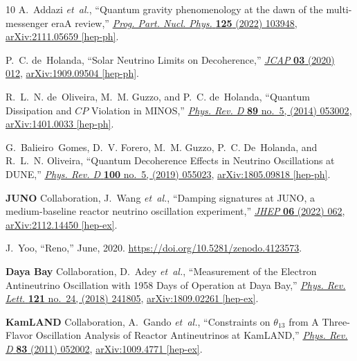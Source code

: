 \documentclass[aps, prd, onecolumn, tightenlines, notitlepage, superscriptaddress, nofootinbib, preprintnumbers, floatfix,showkeys,11pt]{revtex4-2}
\begin{document}
\begin{thebibliography}{10}
A.~Addazi {\em et~al.}, ``{Quantum gravity phenomenology at the dawn of the
  multi-messenger era\textemdash{}A review},''
  \href{http://dx.doi.org/10.1016/j.ppnp.2022.103948}{{\em Prog. Part. Nucl.
  Phys.} {\bfseries 125} (2022) 103948},
  \href{http://arxiv.org/abs/2111.05659}{{\ttfamily arXiv:2111.05659
  [hep-ph]}}.

P.~C. de~Holanda, ``{Solar Neutrino Limits on Decoherence},''
  \href{http://dx.doi.org/10.1088/1475-7516/2020/03/012}{{\em JCAP} {\bfseries
  03} (2020) 012}, \href{http://arxiv.org/abs/1909.09504}{{\ttfamily
  arXiv:1909.09504 [hep-ph]}}.

R.~L.~N. de~Oliveira, M.~M. Guzzo, and P.~C. de~Holanda, ``{Quantum Dissipation
  and $C\!P$ Violation in MINOS},''
  \href{http://dx.doi.org/10.1103/PhysRevD.89.053002}{{\em Phys. Rev. D}
  {\bfseries 89} no.~5, (2014) 053002},
  \href{http://arxiv.org/abs/1401.0033}{{\ttfamily arXiv:1401.0033 [hep-ph]}}.

G.~Balieiro~Gomes, D.~V. Forero, M.~M. Guzzo, P.~C. De~Holanda, and R.~L.~N.
  Oliveira, ``{Quantum Decoherence Effects in Neutrino Oscillations at DUNE},''
  \href{http://dx.doi.org/10.1103/PhysRevD.100.055023}{{\em Phys. Rev. D}
  {\bfseries 100} no.~5, (2019) 055023},
  \href{http://arxiv.org/abs/1805.09818}{{\ttfamily arXiv:1805.09818
  [hep-ph]}}.

{\bfseries JUNO} Collaboration, J.~Wang {\em et~al.}, ``{Damping signatures at
  JUNO, a medium-baseline reactor neutrino oscillation experiment},''
  \href{http://dx.doi.org/10.1007/JHEP06(2022)062}{{\em JHEP} {\bfseries 06}
  (2022) 062}, \href{http://arxiv.org/abs/2112.14450}{{\ttfamily
  arXiv:2112.14450 [hep-ex]}}.

J.~Yoo, ``Reno,'' June, 2020.
\newblock \url{https://doi.org/10.5281/zenodo.4123573}.

{\bfseries Daya Bay} Collaboration, D.~Adey {\em et~al.}, ``{Measurement of the
  Electron Antineutrino Oscillation with 1958 Days of Operation at Daya Bay},''
  \href{http://dx.doi.org/10.1103/PhysRevLett.121.241805}{{\em Phys. Rev.
  Lett.} {\bfseries 121} no.~24, (2018) 241805},
  \href{http://arxiv.org/abs/1809.02261}{{\ttfamily arXiv:1809.02261
  [hep-ex]}}.

{\bfseries KamLAND} Collaboration, A.~Gando {\em et~al.}, ``{Constraints on
  $\theta_{13}$ from A Three-Flavor Oscillation Analysis of Reactor
  Antineutrinos at KamLAND},''
  \href{http://dx.doi.org/10.1103/PhysRevD.83.052002}{{\em Phys. Rev. D}
  {\bfseries 83} (2011) 052002},
  \href{http://arxiv.org/abs/1009.4771}{{\ttfamily arXiv:1009.4771 [hep-ex]}}.


\end{thebibliography}
\end{document}
